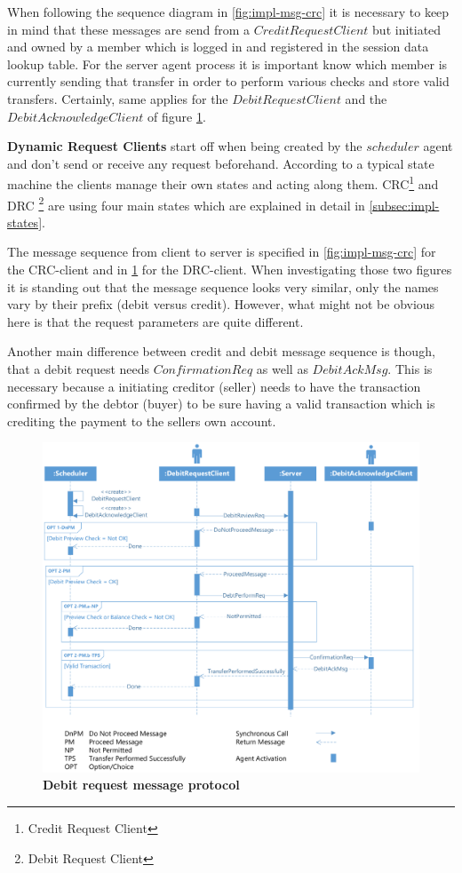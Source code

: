 When following the sequence diagram in \ref{fig:impl-msg-crc} it is necessary to keep in mind that these messages are send from a $CreditRequestClient$ but initiated and owned by a member which is logged in and registered in the session data lookup table. For the server agent process it is important know which member is currently sending that transfer in order to perform various checks and store valid transfers. Certainly, same applies for the $DebitRequestClient$ and the $DebitAcknowledgeClient$ of figure \ref{fig:impl-msg-drc}.

\textbf{Dynamic Request Clients} start off when being created by the $scheduler$ agent and don't send or receive any request beforehand. According to a typical state machine the clients manage their own states and acting along them. CRC\footnote{Credit Request Client} and DRC \footnote{Debit Request Client} are using four main states which are explained in detail in \ref{subsec:impl-states}.

The message sequence from client to server is specified in \ref{fig:impl-msg-crc} for the CRC-client and in \ref{fig:impl-msg-drc} for the DRC-client. When investigating those two figures it is standing out that the message sequence looks very similar, only the names vary by their prefix (debit versus credit). However, what might not be obvious here is that the request parameters are quite different.

Another main difference between credit and debit message sequence is though, that a debit request needs $ConfirmationReq$ as well as $DebitAckMsg$. This is necessary because a initiating creditor (seller) needs to have the transaction confirmed by the debtor (buyer) to be sure having a valid transaction which is crediting the payment to the sellers own account.

\begin{figure}[htbp]
  \centering
  \includegraphics[width=1.0\textwidth]{Figures/debitrequest}
  \caption{\bf\small Debit request message protocol}
  \label{fig:impl-msg-drc}
\end{figure}

